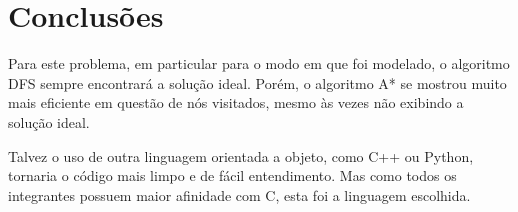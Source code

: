 \documentclass[10pt,a4paper]{article}
\begin{document}
\section{Conclusões}
Para este problema, em particular para o modo em que foi modelado, o algoritmo DFS sempre encontrará a solução ideal. Porém, o algoritmo A* se mostrou muito mais eficiente em questão de nós visitados, mesmo às vezes não exibindo a solução ideal.

Talvez o uso de outra linguagem orientada a objeto, como C++ ou Python, tornaria o código mais limpo e de fácil entendimento. Mas como todos os integrantes possuem maior afinidade com C, esta foi a linguagem escolhida.
\end{document}
